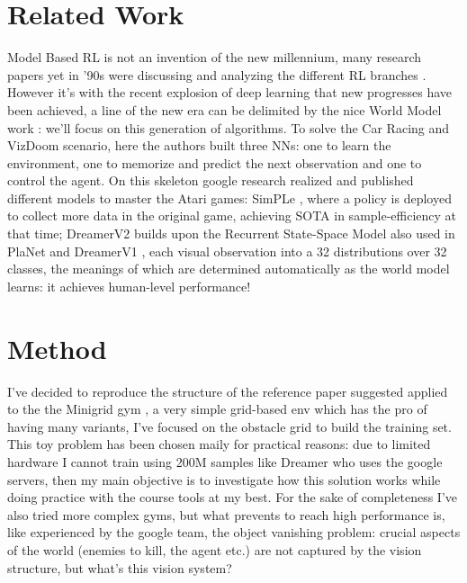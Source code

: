 \documentclass{article}
\begin{document}
\section{Related Work}
Model Based RL is not an invention of the new millennium, many 
research papers yet in '90s were discussing and analyzing the different RL branches \cite{Atkeson97acomparison}.
 However it's with the recent explosion of deep learning  
 that new progresses have been achieved, a line of the new era can be delimited by the nice World Model work 
 \cite{wm}: 
 we'll focus on this generation of algorithms. 
 To solve the Car Racing and VizDoom scenario, here the authors built three NNs: one to learn the environment, one to memorize and predict the next observation and one to control the agent. 
 On this skeleton google research realized and published different models to master the Atari games: SimPLe \cite{simple}, where
 a policy is deployed to collect more data in the original game, achieving SOTA in sample-efficiency at that time; DreamerV2 \cite{dreamerv2} builds upon the Recurrent State-Space Model also used in PlaNet \cite{planet} and DreamerV1 \cite{dreamerv1}, each visual observation into a 32 distributions over 32 classes, the meanings of which are determined automatically as the world model learns: it achieves human-level performance! 
\section{Method}
I've decided to reproduce the structure of the reference paper suggested applied to the 
the Minigrid gym \cite{gym_minigrid}, a very simple grid-based env which has the pro of having many variants, I've focused on the obstacle grid to build the training set. This toy problem has been 
chosen maily for practical reasons: due to limited hardware I cannot train using 200M samples like Dreamer who uses the google servers, then my main objective is to investigate how this solution works 
while doing practice with the course tools at my best. For the sake of completeness I've also tried more complex gyms,
but what prevents to reach high performance is, like experienced by the google team, the object vanishing problem: crucial aspects of the world (enemies to kill, the agent etc.) are not captured by the vision structure, 
but what's this vision system?  
\end{document}

